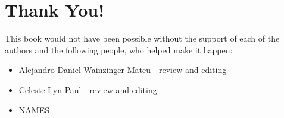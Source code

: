 \section*{Thank You!}

This book would not have been possible without the support of each of the
authors and the following people, who helped make it happen:
\begin{itemize}
 \item Alejandro Daniel Wainzinger Mateu - review and editing
 \item Celeste Lyn Paul - review and editing
 \item NAMES
\end{itemize}

\newpage
